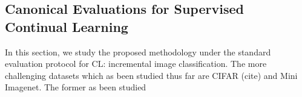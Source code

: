 \documentclass[colorinlistoftodos]{article} %
\begin{document}
\subsection{Canonical Evaluations for Supervised Continual Learning}
\label{sec:can_cl}

In this section, we study the proposed methodology under the standard evaluation protocol for CL: incremental image classification. The more challenging datasets which as been studied thus far are CIFAR (cite) and Mini Imagenet. The former as been studied 



\end{document}
